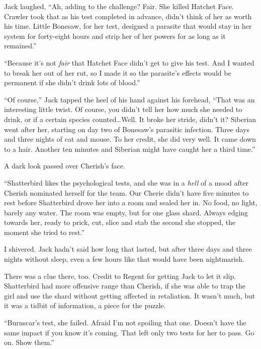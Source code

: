 Jack laughed, ``Ah, adding to the challenge?  Fair.  She killed Hatchet Face.  Crawler took that as his test completed in advance, didn't think of her as worth his time.  Little Bonesaw, for her test, designed a parasite that would stay in her system for forty-eight hours and strip her of her powers for as long as it remained.''



``Because it's not \emph{fair} that Hatchet Face didn't get to give his test.  And I wanted to break her out of her rut, so I made it so the parasite's effects would be permanent if she didn't drink lots of blood.''



``Of course,'' Jack tapped the heel of his hand against his forehead, ``That was an interesting little twist.  Of course, you didn't tell her how much she needed to drink, or if a certain species counted\ldots  Well.  It broke her stride, didn't it?  Siberian went after her, starting on day two of Bonesaw's parasitic infection.  Three days and three nights of cat and mouse.  To her credit, she did very well.  It came down to a hair.  Another ten minutes and Siberian might have caught her a third time.''



A dark look passed over Cherish's face.



``Shatterbird likes the psychological tests, and she was in a \emph{hell} of a mood after Cherish nominated herself for the team.  Our Cherie didn't have five minutes to rest before Shatterbird drove her into a room and sealed her in.  No food, no light, barely any water.  The room was empty, but for one glass shard.  Always edging towards her, ready to prick, cut, slice and stab the second she stopped, the moment she tried to rest.''



I shivered.  Jack hadn't said how long that lasted, but after three days and three nights without sleep, even a few hours like that would have been nightmarish.



There was a clue there, too.  Credit to Regent for getting Jack to let it slip. Shatterbird had more offensive range than Cherish, if she was able to trap the girl and use the shard without getting affected in retaliation.  It wasn't much, but it was a tidbit of information, a piece for the puzzle.



``Burnscar's test, she failed.  Afraid I'm not spoiling that one.  Doesn't have the same impact if you know it's coming.  That left only two tests for her to pass.  Go on.  Show them.''




